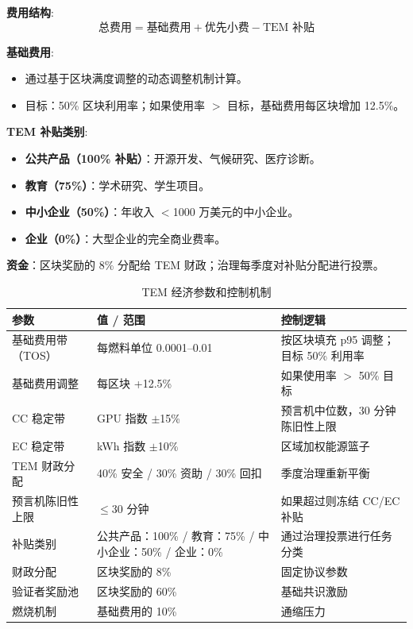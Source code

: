 \documentclass[11pt]{article}
\begin{document}
\textbf{费用结构}:
\begin{equation}
\text{总费用} = \text{基础费用} + \text{优先小费} - \text{TEM 补贴}
\end{equation}

\textbf{基础费用}:
\begin{itemize}[noitemsep]
  \item 通过基于区块满度调整的动态调整机制计算。
  \item 目标：50\% 区块利用率；如果使用率 $>$ 目标，基础费用每区块增加 12.5\%。
\end{itemize}

\textbf{TEM 补贴类别}:
\begin{itemize}[noitemsep]
  \item \textbf{公共产品（100\% 补贴）}：开源开发、气候研究、医疗诊断。
  \item \textbf{教育（75\%）}：学术研究、学生项目。
  \item \textbf{中小企业（50\%）}：年收入 $<$1000 万美元的中小企业。
  \item \textbf{企业（0\%）}：大型企业的完全商业费率。
\end{itemize}

\textbf{资金}：区块奖励的 8\% 分配给 TEM 财政；治理每季度对补贴分配进行投票。

\begin{table}[H]
\centering
\caption{TEM 经济参数和控制机制}
\label{tab:tem-parameters}
\begin{tabular}{@{}p{}p{}p{}@{}}
\toprule
\textbf{参数} & \textbf{值 / 范围} & \textbf{控制逻辑} \\ \midrule
基础费用带（TOS） & 每燃料单位 0.0001--0.01 & 按区块填充 p95 调整；目标 50\% 利用率 \\
基础费用调整 & 每区块 +12.5\% & 如果使用率 $>$ 50\% 目标 \\
CC 稳定带 & GPU 指数 $\pm$15\% & 预言机中位数，30 分钟陈旧性上限 \\
EC 稳定带 & kWh 指数 $\pm$10\% & 区域加权能源篮子 \\
TEM 财政分配 & 40\% 安全 / 30\% 资助 / 30\% 回扣 & 季度治理重新平衡 \\
预言机陈旧性上限 & $\le$30 分钟 & 如果超过则冻结 CC/EC 补贴 \\
补贴类别 & 公共产品：100\% / 教育：75\% / 中小企业：50\% / 企业：0\% & 通过治理投票进行任务分类 \\
财政分配 & 区块奖励的 8\% & 固定协议参数 \\
验证者奖励池 & 区块奖励的 60\% & 基础共识激励 \\
燃烧机制 & 基础费用的 10\% & 通缩压力 \\
\bottomrule
\end{tabular}
\end{table}
\end{document}
